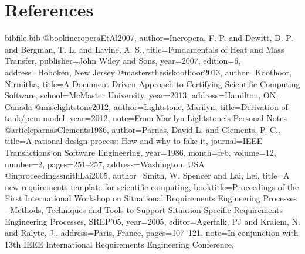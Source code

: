 \documentclass[12pt]{article}
\begin{document}
\section{References}
\label{Sec:References}
\begin{filecontents*}{bibfile.bib}
@book{incroperaEtAl2007,
author={Incropera, F. P. and Dewitt, D. P. and Bergman, T. L. and Lavine, A. S.},
title={Fundamentals of Heat and Mass Transfer},
publisher={John Wiley and Sons},
year={2007},
edition={6},
address={Hoboken, New Jersey}}
@mastersthesis{koothoor2013,
author={Koothoor, Nirmitha},
title={A Document Driven Approach to Certifying Scientific Computing Software},
school={McMaster University},
year={2013},
address={Hamilton, ON, Canada}}
@misc{lightstone2012,
author={Lightstone, Marilyn},
title={Derivation of tank/pcm model},
year={2012},
note={From Marilyn Lightstone's Personal Notes}}
@article{parnasClements1986,
author={Parnas, David L. and Clements, P. C.},
title={A rational design process: How and why to fake it},
journal={IEEE Transactions on Software Engineering},
year={1986},
month=feb,
volume={12},
number={2},
pages={251--257},
address={Washington, USA}}
@inproceedings{smithLai2005,
author={Smith, W. Spencer and Lai, Lei},
title={A new requirements template for scientific computing},
booktitle={Proceedings of the First International Workshop on Situational Requirements Engineering Processes - Methods, Techniques and Tools to Support Situation-Specific Requirements Engineering Processes, SREP'05},
year={2005},
editor={Agerfalk, PJ and Kraiem, N. and Ralyte, J.},
address={Paris, France},
pages={107--121},
note={In conjunction with 13th IEEE International Requirements Engineering Conference,}}
\end{filecontents*}
\nocite{*}
\printbibliography[heading=none]
\end{document}
